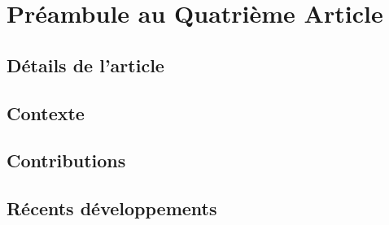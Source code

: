 \chapter{Pr\'{e}ambule au Quatri\`{e}me Article }

\section{D\'{e}tails de l'article}

\section{Contexte}

\section{Contributions}

\section{R\'{e}cents d\'{e}veloppements}

